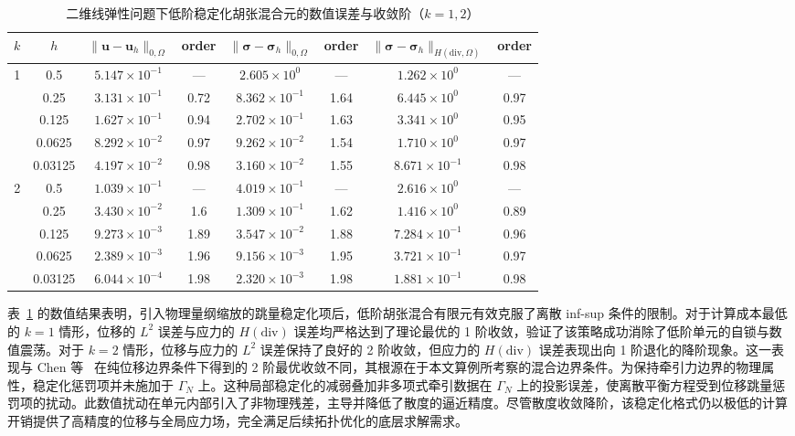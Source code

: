 \begin{table}[htbp]
	\centering
	\caption{二维线弹性问题下低阶稳定化胡张混合元的数值误差与收敛阶（$k=1, 2$）}
	\label{tab:ch5_error_analysis_k12}
	\renewcommand{\arraystretch}{1.3} %
	\begin{tabular}{cccccccc}
		\toprule
		$k$ & $h$ & $\|\bm{u} - \bm{u}_h\|_{0,\Omega}$ & order & $\|\bm{\sigma} - \bm{\sigma}_h\|_{0,\Omega}$ & order & $\|\bm{\sigma} - \bm{\sigma}_h\|_{H(\mathrm{div},\Omega)}$ & order \\
		\midrule
		\multirow{5}{*}{1} 
		& 0.5     & $5.147 \times 10^{-1}$ & ---  & $2.605 \times 10^{0} $ & ---  & $1.262 \times 10^{0} $ & ---  \\
		& 0.25    & $3.131 \times 10^{-1}$ & 0.72 & $8.362 \times 10^{-1}$ & 1.64 & $6.445 \times 10^{0} $ & 0.97 \\
		& 0.125   & $1.627 \times 10^{-1}$ & 0.94 & $2.702 \times 10^{-1}$ & 1.63 & $3.341 \times 10^{0} $ & 0.95 \\
		& 0.0625  & $8.292 \times 10^{-2}$ & 0.97 & $9.262 \times 10^{-2}$ & 1.54 & $1.710 \times 10^{0} $ & 0.97 \\
		& 0.03125 & $4.197 \times 10^{-2}$ & 0.98 & $3.160 \times 10^{-2}$ & 1.55 & $8.671 \times 10^{-1}$ & 0.98 \\
		\midrule
		\multirow{5}{*}{2} 
		& 0.5     & $1.039 \times 10^{-1}$ & ---  & $4.019 \times 10^{-1}$ & ---  & $2.616 \times 10^{0}$ & ---  \\
		& 0.25    & $3.430 \times 10^{-2}$ & 1.6  & $1.309 \times 10^{-1}$ & 1.62 & $1.416 \times 10^{0}$ & 0.89 \\
		& 0.125   & $9.273 \times 10^{-3}$ & 1.89 & $3.547 \times 10^{-2}$ & 1.88 & $7.284 \times 10^{-1}$ & 0.96 \\
		& 0.0625  & $2.389 \times 10^{-3}$ & 1.96 & $9.156 \times 10^{-3}$ & 1.95 & $3.721 \times 10^{-1}$ & 0.97 \\
		& 0.03125 & $6.044 \times 10^{-4}$ & 1.98 & $2.320 \times 10^{-3}$ & 1.98 & $1.881 \times 10^{-1}$ & 0.98 \\
		\bottomrule
	\end{tabular}
\end{table}

表~\ref{tab:ch5_error_analysis_k12} 的数值结果表明，引入物理量纲缩放的跳量稳定化项后，低阶胡张混合有限元有效克服了离散 inf-sup 条件的限制。对于计算成本最低的 $k=1$ 情形，位移的 $L^2$ 误差与应力的 $H(\mathrm{div})$ 误差均严格达到了理论最优的 1 阶收敛，验证了该策略成功消除了低阶单元的自锁与数值震荡。对于 $k=2$ 情形，位移与应力的 $L^2$ 误差保持了良好的 2 阶收敛，但应力的 $H(\mathrm{div})$ 误差表现出向 1 阶退化的降阶现象。这一表现与 Chen 等~\cite{chenStabilizedMixedFinite2017a} 在纯位移边界条件下得到的 2 阶最优收敛不同，其根源在于本文算例所考察的混合边界条件。为保持牵引力边界的物理属性，稳定化惩罚项并未施加于 $\Gamma_N$ 上。这种局部稳定化的减弱叠加非多项式牵引数据在 $\Gamma_N$ 上的投影误差，使离散平衡方程受到位移跳量惩罚项的扰动。此数值扰动在单元内部引入了非物理残差，主导并降低了散度的逼近精度。尽管散度收敛降阶，该稳定化格式仍以极低的计算开销提供了高精度的位移与全局应力场，完全满足后续拓扑优化的底层求解需求。


